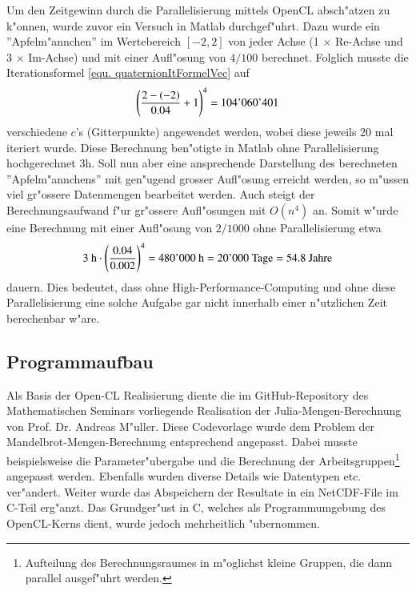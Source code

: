\begin{refsection}
Um den Zeitgewinn durch die Parallelisierung mittels OpenCL absch"atzen
zu k"onnen, wurde zuvor ein Versuch in Matlab durchgef"uhrt. Dazu
wurde ein ''Apfelm"annchen'' im Wertebereich $[-2, 2]$ von jeder
Achse (1 $\times$ Re-Achse und 3 $\times$ Im-Achse) und mit einer
Aufl"osung von $4/100$ berechnet. Folglich musste die Iterationsformel
\ref{equ. quaternionItFormelVec} auf
\begin{equation}
	\left(\frac{2-(-2)}{0.04}+1\right)^4 = 104\text{\strut'}060\text{\strut'}401
	\label{equ. anzItt}
\end{equation}
verschiedene $c$'s (Gitterpunkte) angewendet werden, wobei diese
jeweils 20 mal iteriert wurde. Diese Berechnung ben"otigte in Matlab
ohne Parallelisierung hochgerechnet 3h. Soll nun aber eine ansprechende
Darstellung des berechneten ''Apfelm"annchens'' mit gen"ugend grosser
Aufl"osung erreicht werden, so m"ussen viel gr"ossere Datenmengen
bearbeitet werden. Auch steigt der Berechnungsaufwand f"ur gr"ossere
Aufl"osungen mit $O(n^4)$ an. Somit w"urde eine Berechnung mit einer
Aufl"osung von $2/1000$ ohne Parallelisierung etwa
\begin{equation}
3 \text{ h} \cdot \left(\frac{0.04}{0.002}\right)^4 = 480\text{\strut'}000 \text{ h} = 20\text{\strut'}000 \text{ Tage} = 54.8 \text{ Jahre}
	\label{equ. timeOhneParallel}
\end{equation}
dauern. Dies bedeutet, dass ohne High-Performance-Computing und ohne
diese Parallelisierung eine solche Aufgabe gar nicht innerhalb einer
n"utzlichen Zeit berechenbar w"are.

\subsection{Programmaufbau}
Als Basis der Open-CL Realisierung diente die im GitHub-Repository
des Mathematischen Seminars vorliegende Realisation der
Julia-Mengen-Berechnung von Prof. Dr. Andreas M"uller. Diese Codevorlage
wurde dem Problem der Mandelbrot-Mengen-Berechnung entsprechend
angepasst. Dabei musste beispielsweise die Parameter"ubergabe und die
Berechnung der Arbeitsgruppen\footnote{Aufteilung des Berechnungsraumes
in m"oglichst kleine Gruppen, die dann parallel ausgef"uhrt werden.}
angepasst werden. Ebenfalls wurden diverse Details wie Datentypen
etc. ver"andert. Weiter wurde das Abspeichern der Resultate in ein
NetCDF-File im C-Teil erg"anzt. Das Grundger"ust in C, welches als
Programmumgebung des OpenCL-Kerns dient, wurde jedoch mehrheitlich
"ubernommen.


\end{refsection}
